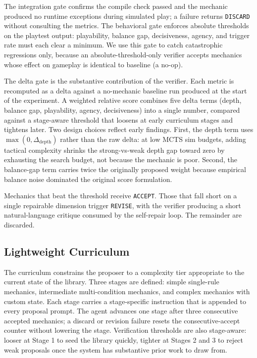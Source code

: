 \documentclass[conference]{IEEEtran}
\begin{document}
The integration gate confirms the compile check passed and the mechanic produced no runtime exceptions during simulated play; a failure returns \texttt{DISCARD} without consulting the metrics. The behavioral gate enforces absolute thresholds on the playtest output: playability, balance gap, decisiveness, agency, and trigger rate must each clear a minimum. We use this gate to catch catastrophic regressions only, because an absolute-threshold-only verifier accepts mechanics whose effect on gameplay is identical to baseline (a no-op).

The delta gate is the substantive contribution of the verifier. Each metric is recomputed as a delta against a no-mechanic baseline run produced at the start of the experiment. A weighted relative score combines five delta terms (depth, balance gap, playability, agency, decisiveness) into a single number, compared against a stage-aware threshold that loosens at early curriculum stages and tightens later. Two design choices reflect early findings. First, the depth term uses $\max(0, \Delta_\text{depth})$ rather than the raw delta: at low MCTS sim budgets, adding tactical complexity shrinks the strong-vs-weak depth gap toward zero by exhausting the search budget, not because the mechanic is poor. Second, the balance-gap term carries twice the originally proposed weight because empirical balance noise dominated the original score formulation.

Mechanics that beat the threshold receive \texttt{ACCEPT}. Those that fall short on a single repairable dimension trigger \texttt{REVISE}, with the verifier producing a short natural-language critique consumed by the self-repair loop. The remainder are discarded.

\subsection{Lightweight Curriculum}

The curriculum constrains the proposer to a complexity tier appropriate to the current state of the library. Three stages are defined: simple single-rule mechanics, intermediate multi-condition mechanics, and complex mechanics with custom state. Each stage carries a stage-specific instruction that is appended to every proposal prompt. The agent advances one stage after three consecutive accepted mechanics; a discard or revision failure resets the consecutive-accept counter without lowering the stage. Verification thresholds are also stage-aware: looser at Stage 1 to seed the library quickly, tighter at Stages 2 and 3 to reject weak proposals once the system has substantive prior work to draw from.
\end{document}

